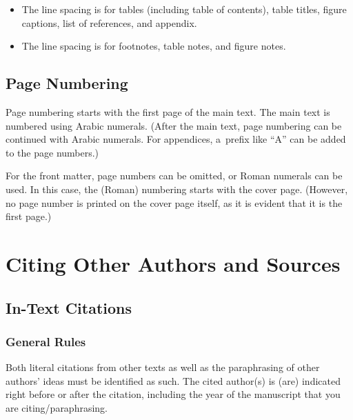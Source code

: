 \begin{itemize}
\begin{itemize}
			\item Level-4 headings (\verb|\paragraph|) are spaced \makeatletter\SI[round-mode = places, round-precision = 2]{\strip@pt\baselinedistHalf}{pt}\makeatother\ above and 0~pt below. (Level-4 headings are usually unnecessary in documents that have the scope of theses.)
		\end{itemize}
	\item The line spacing is \printlength{\smalllinespacing} for tables (including table of contents), table titles, figure captions, list of references, and appendix.
	\item The line spacing is \printlength{\footnotelinespacing} for footnotes, table notes, and figure notes.
\end{itemize}

\subsection{Page Numbering}

Page numbering starts with the first page of the main text. The main text is numbered using Arabic numerals. (After the main text, page numbering can be continued with Arabic numerals. For appendices, a~prefix like ``A'' can be added to the page numbers.)

For the front matter, page numbers can be omitted, or Roman numerals can be used. In this case, the (Roman) numbering starts with the cover page. (However, no page number is printed on the cover page itself, as it is evident that it is the first page.)


\section{Citing Other Authors and Sources}
\label{sec:citations}

\subsection{In-Text Citations}

\subsubsection{General Rules}

Both literal citations from other texts as well as the paraphrasing of other authors' ideas must be identified as such. The cited author(s) is (are) indicated right before or after the citation, including the year of the manuscript that you are citing/paraphrasing.

